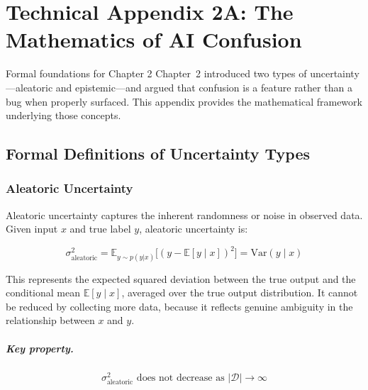 
\chapter*{Technical Appendix 2A: The Mathematics of AI Confusion}

\begin{chapterquote}{Formal foundations for Chapter 2}
Chapter~2 introduced two types of uncertainty---aleatoric and epistemic---and argued that confusion is a feature rather than a bug when properly surfaced. This appendix provides the mathematical framework underlying those concepts.
\end{chapterquote}

\apxnumon
\section{Formal Definitions of Uncertainty Types}

\subsection{Aleatoric Uncertainty}

Aleatoric uncertainty captures the inherent randomness or noise in observed data. Given input $x$ and true label $y$, aleatoric uncertainty is:

\[
\sigma^2_{\text{aleatoric}} = \mathbb{E}_{y \sim p(y|x)}\bigl[(y - \mathbb{E}[y \mid x])^2\bigr] = \mathrm{Var}(y \mid x)
\]

This represents the expected squared deviation between the true output and the conditional mean $\mathbb{E}[y \mid x]$, averaged over the true output distribution. It cannot be reduced by collecting more data, because it reflects genuine ambiguity in the relationship between $x$ and $y$.

\paragraph{Key property.}
\[
\sigma^2_{\text{aleatoric}} \text{ does not decrease as } |\mathcal{D}| \to \infty
\]

